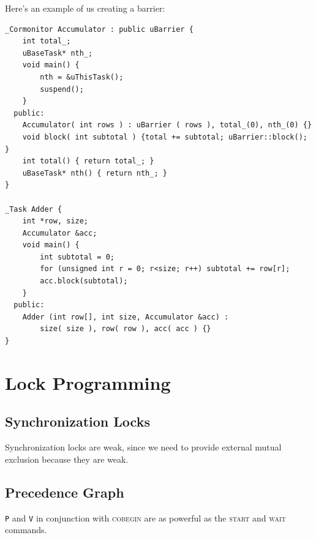                     Here's an example of us creating a barrier:
                    \begin{lstlisting}
_Cormonitor Accumulator : public uBarrier {
    int total_;
    uBaseTask* nth_;
    void main() {
        nth = &uThisTask();
        suspend();
    }
  public:
    Accumulator( int rows ) : uBarrier ( rows ), total_(0), nth_(0) {}
    void block( int subtotal ) {total += subtotal; uBarrier::block(); }
    int total() { return total_; }
    uBaseTask* nth() { return nth_; }
}

_Task Adder {
    int *row, size;
    Accumulator &acc;
    void main() {
        int subtotal = 0;
        for (unsigned int r = 0; r<size; r++) subtotal += row[r];
        acc.block(subtotal);
    }
  public:
    Adder (int row[], int size, Accumulator &acc) :
        size( size ), row( row ), acc( acc ) {}
}
                    \end{lstlisting}
        \section{Lock Programming} %
        \label{sec:lock_programming}
            \subsection{Synchronization Locks} %
            \label{sub:synchronization_locks}
                Synchronization locks are weak, since we need to provide external mutual exclusion because they are weak.
            \subsection{Precedence Graph} %
            \label{sub:precedence_graph}
                \verb|P| and \verb|V| in conjunction with \textsc{cobegin} are as powerful as the \textsc{start} and \textsc{wait} commands.

